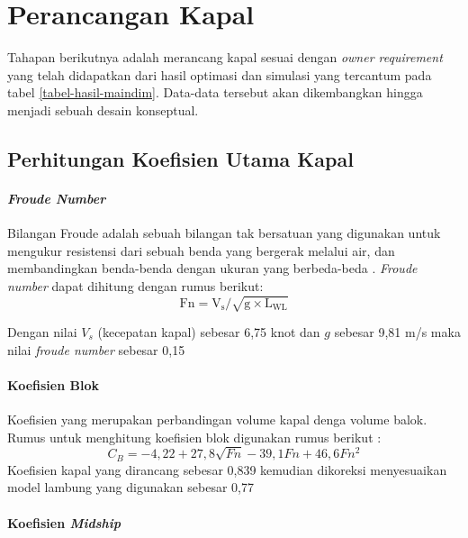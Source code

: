 \section{Perancangan Kapal}
\label{sec:last-perancangan-kapal}

Tahapan berikutnya adalah merancang kapal sesuai dengan \emph{owner requirement} yang telah didapatkan dari hasil optimasi dan simulasi yang tercantum pada tabel \ref{tabel-hasil-maindim}. Data-data tersebut akan dikembangkan hingga menjadi sebuah desain konseptual.

\subsection{Perhitungan Koefisien Utama Kapal}
\label{subsec:perhitungan-koefisien}

\paragraph{\emph{Froude Number}}

Bilangan Froude adalah sebuah bilangan tak bersatuan yang digunakan untuk mengukur resistensi dari sebuah benda yang bergerak melalui air, dan membandingkan benda-benda dengan ukuran yang berbeda-beda \citep{Lewis_Engineers_1988}. \emph{Froude number} dapat dihitung dengan rumus berikut:
\begin{equation}
    \mathrm{Fn}=\mathrm{V_s}/\sqrt{\mathrm{g} \times \mathrm{L_{WL}}}
\end{equation}

Dengan nilai $V_s$ (kecepatan kapal) sebesar 6,75 knot dan $g$ sebesar 9,81 m/s maka nilai \emph{froude number} sebesar 0,15

\paragraph{Koefisien Blok}

Koefisien yang merupakan perbandingan volume kapal denga volume balok. Rumus untuk menghitung koefisien blok digunakan rumus berikut \citep{Parsons_2001}:
\begin{equation}
    C_B = -4,22 + 27,8 \sqrt{Fn} -39,1Fn + 46,6 Fn^2
\end{equation}
Koefisien kapal yang dirancang sebesar 0,839 kemudian dikoreksi menyesuaikan model lambung yang digunakan sebesar 0,77
 
\paragraph{Koefisien \emph{Midship}}

